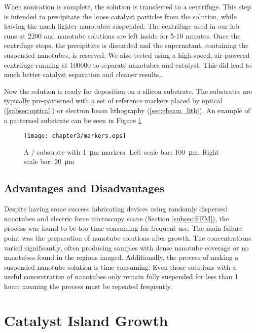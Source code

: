 When sonication is complete, the solution is transferred to a centrifuge. This step is intended to precipitate the loose catalyst particles from the solution, while leaving the much lighter nanotubes suspended. The centrifuge used in our lab runs at \SI{2200}{\rpm} and nanotube solutions are left inside for 5-10 minutes. Once the centrifuge stops, the precipitate is discarded and the supernatant, containing the suspended nanotubes, is reserved. We also tested using a high-speed, air-powered centrifuge running at \SI{100000}{\rpm} to separate nanotubes and catalyst. This did lead to much better catalyst separation and cleaner results,.

Now the solution is ready for deposition on a silicon substrate. The substrates are typically pre-patterned with a set of reference markers placed by optical (\ref{subsec:optical}) or electron beam lithography (\ref{sec:ebeam_lith}). An example of a patterned substrate can be seen in Figure \ref{fig:markers}

\begin{figure}
    \centering
    \texttt{[image: chapter3/markers.eps]}
    \caption{A / substrate with \SI{1}{\micro\meter}  markers. Left scale bar: \SI{100}{\micro\meter}. Right scale bar: \SI{20}{\micro\meter} }
    \label{fig:markers}
\end{figure}

\subsection{Advantages and Disadvantages}

Despite having some success fabricating devices using randomly dispersed nanotubes and electric force microscopy scans (Section \ref{subsec:EFM}), the process was found to be too time consuming for frequent use. The main failure point was the preparation of nanotube solutions after growth. The concentrations varied significantly, often producing samples with dense nanotube coverage or no nanotubes found in the regions imaged. Additionally, the process of making a suspended nanotube solution is time consuming. Even those solutions with a useful concentration of nanotubes only remain fully suspended for less than 1 hour; meaning the process must be repeated frequently.

\section{Catalyst Island Growth}
\label{sec:catalyst_island}

